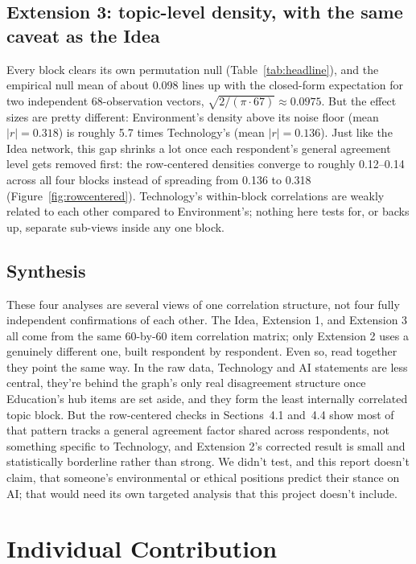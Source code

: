 \documentclass[11pt]{article}
\begin{document}
\subsection{Extension 3: topic-level density, with the same caveat as the Idea}

Every block clears its own permutation null (Table~\ref{tab:headline}), and the empirical null mean of
about 0.098 lines up with the closed-form expectation for two independent 68-observation vectors,
$\sqrt{2/(\pi \cdot 67)} \approx 0.0975$. But the effect sizes are pretty different: Environment's
density above its noise floor (mean $|r| = 0.318$) is roughly 5.7 times Technology's (mean
$|r| = 0.136$). Just like the Idea network, this gap shrinks a lot once each respondent's general
agreement level gets removed first: the row-centered densities converge to roughly 0.12--0.14 across
all four blocks instead of spreading from 0.136 to 0.318 (Figure~\ref{fig:rowcentered}). Technology's
within-block correlations are weakly related to each other compared to Environment's; nothing here
tests for, or backs up, separate sub-views inside any one block.

\subsection{Synthesis}

These four analyses are several views of one correlation structure, not four fully independent
confirmations of each other. The Idea, Extension 1, and Extension 3 all come from the same 60-by-60
item correlation matrix; only Extension 2 uses a genuinely different one, built respondent by
respondent. Even so, read together they point the same way. In the raw data, Technology and AI
statements are less central, they're behind the graph's only real disagreement structure once
Education's hub items are set aside, and they form the least internally correlated topic block. But
the row-centered checks in Sections~4.1 and~4.4 show most of that pattern tracks a general agreement
factor shared across respondents, not something specific to Technology, and Extension 2's corrected
result is small and statistically borderline rather than strong. We didn't test, and this report
doesn't claim, that someone's environmental or ethical positions predict their stance on AI; that
would need its own targeted analysis that this project doesn't include.

\section{Individual Contribution}
\end{document}
